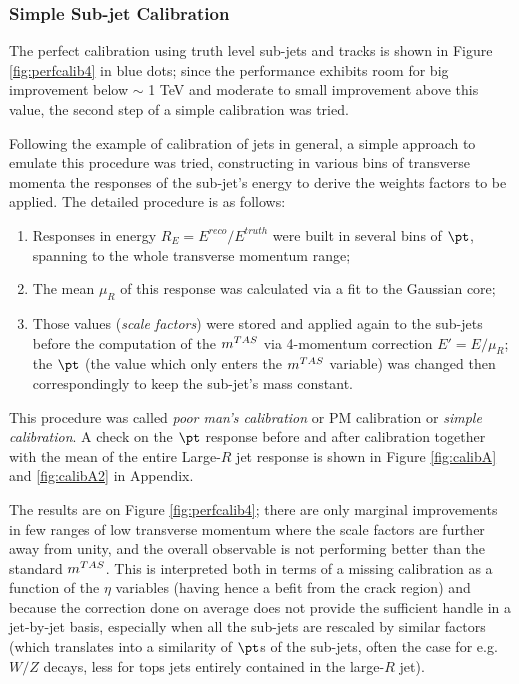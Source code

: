 \subsubsection{Simple Sub-jet Calibration}
The perfect calibration using truth level sub-jets and tracks is shown in Figure \ref{fig:perfcalib4} in blue dots; since the performance exhibits room for big improvement below $\sim$ 1 TeV and moderate to small improvement above this value, the second step of a simple calibration was tried.

Following the example of calibration of jets in general, a simple approach to emulate this procedure was tried, constructing in various bins of transverse momenta the responses of the sub-jet's energy to derive the weights factors to be applied. The detailed procedure is as follows:
\begin{enumerate}
 \item Responses in energy $R_E=E^{reco}/E^{truth}$ were built in several bins of $\pt$, spanning to the whole transverse momentum range;
 \item The mean $\mu_R$ of this response was calculated via a fit to the Gaussian core;
 \item Those values (\textit{scale factors}) were stored and applied again to the sub-jets before the computation of the $m^{TAS}$ via 4-momentum correction $E'=E/\mu_R$; the $\pt$ (the value which only enters the $m^{TAS}$ variable) was changed then correspondingly to keep the sub-jet's mass constant.
\end{enumerate}

This procedure was called \textit{poor man's calibration} or PM calibration or \textit{simple calibration}.
A check on the $\pt$ response before and after calibration together with the mean of the entire Large-$R$ jet response is shown in Figure \ref{fig:calibA} and \ref{fig:calibA2} in Appendix.

The results are on Figure \ref{fig:perfcalib4}; there are only marginal improvements in few ranges of low transverse momentum where the scale factors are further away from unity, and the overall observable is not performing better than the standard $m^{TAS}$. This is interpreted both in terms of a missing calibration as a function of the $\eta$ variables (having hence a befit from the crack region) and because the correction done on average does not provide the sufficient handle in a jet-by-jet basis, especially when all the sub-jets are rescaled by similar factors (which translates into a similarity of $\pt$s of the sub-jets, often the case for e.g. $W/Z$ decays, less for tops jets entirely contained in the large-$R$ jet).

